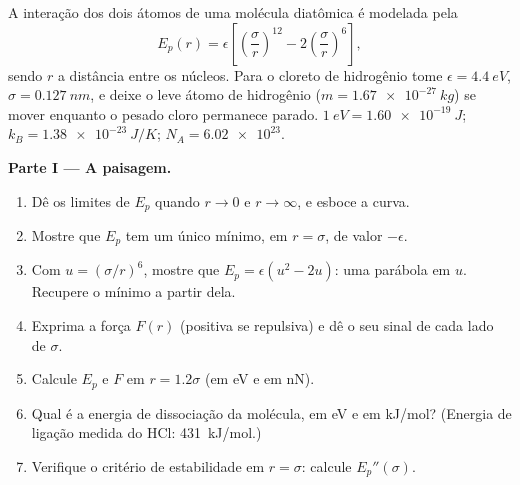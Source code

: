 \begin{problem}
\label{pb:b1:work-and-energy:1}
A interação dos dois átomos de uma molécula diatômica é modelada pela
\[
E_p(r) = \epsilon\left[\left(\frac{\sigma}{r}\right)^{12} - 2\left(\frac{\sigma}{r}\right)^{6}\right],
\]
sendo $r$ a distância entre os núcleos. Para o cloreto de hidrogênio tome
$\epsilon = \qty{4.4}{eV}$, $\sigma = \qty{0.127}{nm}$, e deixe o leve
átomo de hidrogênio ($m = \qty{1.67e-27}{kg}$) se mover enquanto o pesado cloro
permanece parado. $\qty{1}{eV} = \qty{1.60e-19}{J}$; $k_B = \qty{1.38e-23}{J/K}$;
$N_A = \num{6.02e23}$.

\medskip
\noindent\textbf{Parte I --- A paisagem.}
\begin{enumerate}
  \item Dê os limites de $E_p$ quando $r \to 0$ e $r \to \infty$, e
        esboce a curva.
  \item Mostre que $E_p$ tem um único mínimo, em $r = \sigma$, de valor
        $-\epsilon$.
  \item Com $u = (\sigma/r)^6$, mostre que $E_p = \epsilon(u^2 - 2u)$: uma
        parábola em $u$. Recupere o mínimo a partir dela.
  \item Exprima a força $F(r)$ (positiva se repulsiva) e dê o seu
        sinal de cada lado de $\sigma$.
  \item Calcule $E_p$ e $F$ em $r = 1.2\sigma$ (em eV e em nN).
  \item Qual é a energia de dissociação da molécula, em eV e em
        \unit{kJ/mol}? (Energia de ligação medida do HCl: \qty{431}{kJ/mol}.)
  \item Verifique o critério de estabilidade em $r = \sigma$: calcule
        $E_p''(\sigma)$.
\end{enumerate}


\end{problem}
